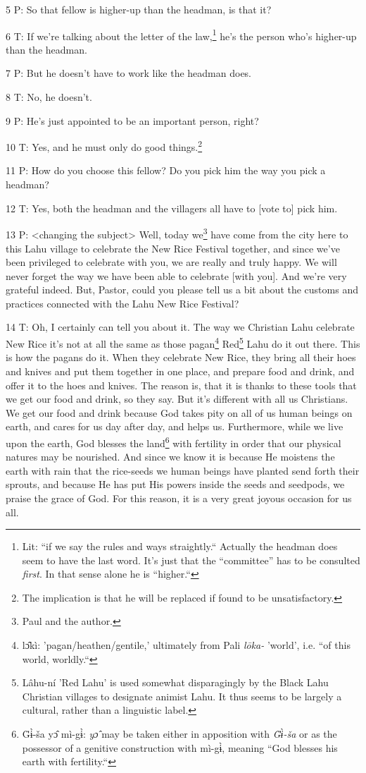 5 P: So that fellow is higher-up than the headman, is that it?

6 T: If we're talking about the letter of the law,\footnote{Lit: ``if we say the rules and ways straightly.`` Actually the headman does seem to have the last word. It's just that the ``committee'' has to be consulted \textit{first}. In that sense alone he is ``higher.``} he's the person who's higher-up
than the headman.

7 P: But he doesn't have to work like the headman does.

8 T: No, he doesn't.

9 P: He's just appointed to be an important person, right?

10 T: Yes, and he must only do good things.\footnote{The implication is that he will be replaced if found to be unsatisfactory.}

11 P: How do you choose this fellow? Do you pick him the way you pick a headman?

12 T: Yes, both the headman and the villagers all have to [vote to] pick him.

13 P: <changing the subject> Well, today we\footnote{Paul and the author.} have come from
the city here to this Lahu village to celebrate the New Rice Festival together,
and since we've been privileged to celebrate with you, we are really and truly
happy. We will never forget the way we have been able to celebrate [with you].
And we're very grateful indeed. But, Pastor, could you please tell us a bit about
the customs and practices connected with the Lahu New Rice Festival?

14 T: Oh, I certainly can tell you about it. The way we Christian Lahu celebrate
New Rice it's not at all the same as those pagan\footnote{lɔ̂kì: 'pagan/heathen/gentile,' ultimately from Pali \textit{lōka-} 'world', i.e. ``of this world, worldly.``} Red\footnote{Lâhu-ní 'Red Lahu' is used somewhat disparagingly by the Black Lahu Christian villages to designate animist Lahu. It thus seems to be largely a cultural, rather than a linguistic label.} Lahu do it out there.
This is how the pagans do it. When they celebrate New Rice, they bring all their
hoes and knives and put them together in one place, and prepare food and drink,
and offer it to the hoes and knives. The reason is, that it is thanks to these
tools that we get our food and drink, so they say. But it's different with all
us Christians. We get our food and drink because God takes pity on all of us human
beings on earth, and cares for us day after day, and helps us. Furthermore, while
we live upon the earth, God blesses the land\footnote{G̈ɨ̀-ša yɔ̂ mì-gɨ̀: \textit{yɔ̂} may be taken either in apposition with \textit{G̈ɨ̀-ša} or as the possessor of a genitive construction with mì-gɨ̀, meaning ``God blesses his earth with fertility.``} with fertility in order that our
physical natures may be nourished. And since we know it is because He moistens
the earth with rain that the rice-seeds we human beings have planted send forth
their sprouts, and because He has put His powers inside the seeds and seedpods,
we praise the grace of God. For this reason, it is a very great joyous occasion
for us all.

